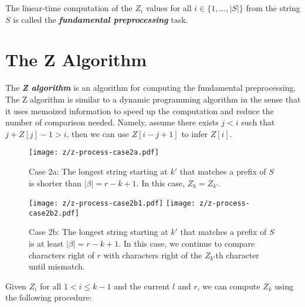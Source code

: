 The linear-time computation of the $Z_i$ values for all $i \in \{1,\ldots,|S|\}$ from the string $S$ is called the \textit{\textbf{fundamental preprocessing}} task.

\section{The Z Algorithm} 

The \textit{\textbf{Z algorithm}} is an algorithm for computing the fundamental preprocessing. The Z algorithm is similar to a dynamic programming algorithm in the sense that it uses memoized information to speed up the computation and reduce the number of comparison needed. Namely, assume there exists $j < i$ such that $j + Z[j] - 1 > i$, then we can use $Z[i-j+1]$ to infer $Z[i]$.

\begin{figure}[htbp]
    \centering
    \texttt{[image: z/z-process-case2a.pdf]}
    \caption{Case 2a: The longest string starting at $k'$ that matches a prefix of $S$ is shorter than $|\beta| = r-k+1$. In this case, $Z_k = Z_{k'}$.}
    \label{fig:z-process-case2a}
\end{figure}

\begin{figure}[htbp]
    \centering
    \texttt{[image: z/z-process-case2b1.pdf]}
    \texttt{[image: z/z-process-case2b2.pdf]}
    \caption{Case 2b: The longest string starting at $k'$ that matches a prefix of $S$ is at least $|\beta| = r-k+1$. In this case, we continue to compare characters right of $r$ with characters right of the $Z_{k'}$th character until mismatch. }
    \label{fig:z-process-case2b}
\end{figure}

Given $Z_i$ for all $1 < i \leq k-1$ and the current $l$ and $r$, we can compute $Z_k$ using the following procedure:

